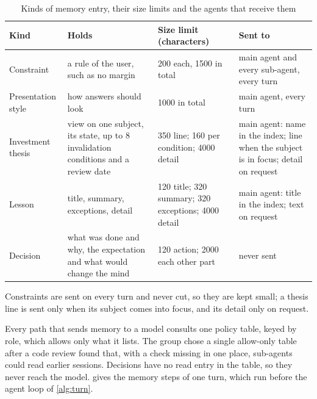 \begin{table}[H]
  \centering
  \caption{Kinds of memory entry, their size limits and the agents that receive them}\label{tab:memory-kinds}
  \begin{tabularx}{\textwidth}{@{}l L L L@{}}
    \toprule
    {Kind} & {Holds} & {Size limit (characters)} & {Sent to}\\
    \midrule
    Constraint & a rule of the user, such as no margin & \num{200} each, \num{1500} in total & main agent and every sub-agent, every turn\\
    \addlinespace[2pt]
    Presentation style & how answers should look & \num{1000} in total & main agent, every turn\\
    \addlinespace[2pt]
    Investment thesis & view on one subject, its state, up to \num{8} invalidation conditions and a review date & \num{350} line; \num{160} per condition; \num{4000} detail & main agent: name in the index; line when the subject is in focus; detail on request\\
    \addlinespace[2pt]
    Lesson & title, summary, exceptions, detail & \num{120} title; \num{320} summary; \num{320} exceptions; \num{4000} detail & main agent: title in the index; text on request\\
    \addlinespace[2pt]
    Decision & what was done and why, the expectation and what would change the mind & \num{120} action; \num{2000} each other part & never sent\\
    \bottomrule
  \end{tabularx}
\end{table}

Constraints are sent on every turn and never cut, so they are kept small; a thesis line is sent only when its subject comes into focus, and its detail only on request.

Every path that sends memory to a model consults one policy table, keyed by role, which allows only what it lists.
The group chose a single allow-only table after a code review found that, with a check missing in one place, sub-agents could read earlier sessions.
Decisions have no read entry in the table, so they never reach the model.
 gives the memory steps of one turn, which run before the agent loop of \cref{alg:turn}.

